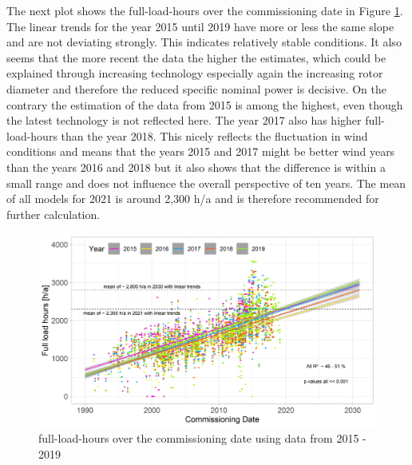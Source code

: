 \documentclass[a4paper,11pt]{article}
\begin{document}
The next plot shows the full-load-hours over the commissioning date in Figure \ref{fig:full}. The linear trends for the year 2015 until 2019 have more or less the same slope and are not deviating strongly. This indicates relatively stable conditions. It also seems that the more recent the data the higher the estimates, which could be explained through increasing technology especially again the increasing rotor diameter and therefore the reduced specific nominal power is decisive. On the contrary the estimation of the data from 2015 is among the highest, even though the latest technology is not reflected here. The year 2017 also has higher full-load-hours than the year 2018. This nicely reflects the fluctuation in wind conditions and means that the years 2015 and 2017 might be better wind years than the years 2016 and 2018 but it also shows that the difference is within a small range and does not influence the overall perspective of ten years. The mean of all models for 2021 is around 2,300 h/a and is therefore recommended for further calculation.
\begin{figure}[H]

{\centering \includegraphics[width=1\linewidth]{data/Amprion/results_of_analysis/flh} 

}

\caption{full-load-hours over the commissioning date using data from 2015 - 2019}\label{fig:full}
\end{figure}
\end{document}
